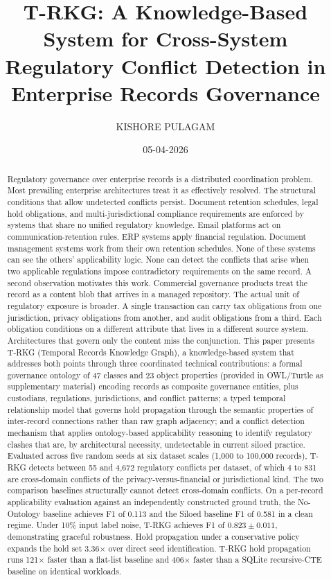 \documentclass{ieeeaccess}
\title{T-RKG: A Knowledge-Based System for Cross-System Regulatory Conflict Detection in Enterprise Records Governance}
\author{\uppercase{Kishore Pulagam}\authorrefmark{1}\orcid{0009-0006-7929-8699}}
\date{05-04-2026}
\begin{document}
\maketitle

\begin{abstract}
Regulatory governance over enterprise records is a distributed coordination problem. Most prevailing enterprise architectures treat it as effectively resolved. The structural conditions that allow undetected conflicts persist. Document retention schedules, legal hold obligations, and multi-jurisdictional compliance requirements are enforced by systems that share no unified regulatory knowledge. Email platforms act on communication-retention rules. ERP systems apply financial regulation. Document management systems work from their own retention schedules. None of these systems can see the others' applicability logic. None can detect the conflicts that arise when two applicable regulations impose contradictory requirements on the same record. A second observation motivates this work. Commercial governance products treat the record as a content blob that arrives in a managed repository. The actual unit of regulatory exposure is broader. A single transaction can carry tax obligations from one jurisdiction, privacy obligations from another, and audit obligations from a third. Each obligation conditions on a different attribute that lives in a different source system. Architectures that govern only the content miss the conjunction. This paper presents T-RKG (Temporal Records Knowledge Graph), a knowledge-based system that addresses both points through three coordinated technical contributions: a formal governance ontology of 47 classes and 23 object properties (provided in OWL/Turtle as supplementary material) encoding records as composite governance entities, plus custodians, regulations, jurisdictions, and conflict patterns; a typed temporal relationship model that governs hold propagation through the semantic properties of inter-record connections rather than raw graph adjacency; and a conflict detection mechanism that applies ontology-based applicability reasoning to identify regulatory clashes that are, by architectural necessity, undetectable in current siloed practice. Evaluated across five random seeds at six dataset scales (1{,}000 to 100{,}000 records), T-RKG detects between 55 and 4{,}672 regulatory conflicts per dataset, of which 4 to 831 are cross-domain conflicts of the privacy-versus-financial or jurisdictional kind. The two comparison baselines structurally cannot detect cross-domain conflicts. On a per-record applicability evaluation against an independently constructed ground truth, the No-Ontology baseline achieves F1 of 0.113 and the Siloed baseline F1 of 0.581 in a clean regime. Under 10\% input label noise, T-RKG achieves F1 of $0.823 \pm 0.011$, demonstrating graceful robustness. Hold propagation under a conservative policy expands the hold set 3.36$\times$ over direct seed identification. T-RKG hold propagation runs 121$\times$ faster than a flat-list baseline and 406$\times$ faster than a SQLite recursive-CTE baseline on identical workloads.
\end{abstract}
\end{document}
